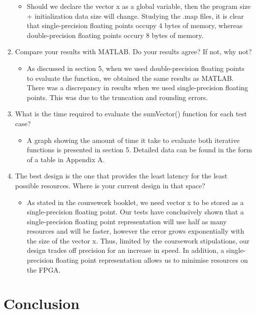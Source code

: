 \documentclass{article}
\begin{document}
\begin{enumerate}[align=left]
\begin{itemize}
        \item Should we declare the vector x as a global variable, then the program size + initialization data size will change. Studying the .map files, it is clear that single-precision floating points occupy 4 bytes of memory, whereas double-precision floating points occury 8 bytes of memory.
    \end{itemize}
    \item Compare your results with MATLAB. Do your results agree? If not, why not?
    \begin{itemize}
        \item As discussed in section \num{5}, when we used double-precision floating points to evaluate the function, we obtained the same results as MATLAB. There was a discrepancy in results when we used single-precision floating points. This was due to the truncation and rounding errors. 
    \end{itemize}
    \item What is the time required to evaluate the sumVector() function for each test case?
    \begin{itemize}
        \item A graph showing the amount of time it take to evaluate both iterative functions is presented in section \num{5}. Detailed data can  be found in the form of a table in Appendix A.
    \end{itemize}
    \item The best design is the one that provides the least latency for the least possible resources. Where is your current design in that space?
    \begin{itemize}
        \item As stated in the coursework booklet, we need vector x to be stored as a single-precision floating point. Our tests have conclusively shown that a single-precision floating point representation will use half as many resources and will be faster, however the error grows exponentially with the size of the vector x. Thus, limited  by the coursework stipulations, our design trades off precision for an increase in speed. In addition, a single-precision floating point representation allows us to minimise resources on the FPGA.
    \end{itemize}
\end{enumerate}

\newpage
\section{Conclusion}
\end{document}
